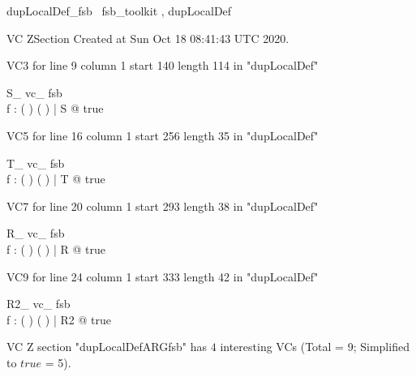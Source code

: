 \documentclass{article}
\begin{document}

\begin{zsection}	 \SECTION dupLocalDef\_fsb \parents~fsb\_toolkit , dupLocalDef
\end{zsection}

VC ZSection Created at Sun Oct 18 08:41:43 UTC 2020.

VC3 for line 9 column 1 start 140 length 114 in "dupLocalDef"
\begin{theorem}{ S\_ vc\_ fsb}\\
 \exists f : ( \nat \pfun \nat ) \cap \power ( \nat \cross \nat ) | S @ true \\

\end{theorem}

VC5 for line 16 column 1 start 256 length 35 in "dupLocalDef"
\begin{theorem}{ T\_ vc\_ fsb}\\
 \exists f : ( \nat \pfun \nat ) \cap \power ( \nat \cross \nat ) | T @ true \\

\end{theorem}

VC7 for line 20 column 1 start 293 length 38 in "dupLocalDef"
\begin{theorem}{ R\_ vc\_ fsb}\\
 \exists f : ( \nat \pfun \nat ) \cap \power ( \nat \cross \nat ) | R @ true \\

\end{theorem}

VC9 for line 24 column 1 start 333 length 42 in "dupLocalDef"
\begin{theorem}{ R2\_ vc\_ fsb}\\
 \exists f : ( \nat \pfun \nat ) \cap \power ( \nat \cross \nat ) | R2 @ true \\

\end{theorem}



 VC Z section "dupLocalDefARGfsb" has $4$ interesting VCs (Total = 9; Simplified to $true$ = 5).



\end{document}
